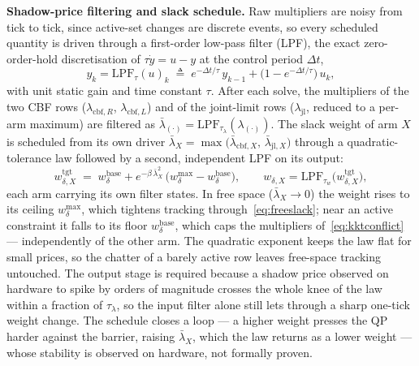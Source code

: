 \textbf{Shadow-price filtering and slack schedule.} Raw multipliers are noisy from tick to tick, since active-set changes are discrete events, so every scheduled quantity is driven through a first-order low-pass filter (LPF), the exact zero-order-hold discretisation of $\tau\dot{y} = u - y$ at the control period $\Delta t$,
\begin{equation}
y_k = \text{LPF}_{\tau}(u)_k \;\triangleq\; e^{-\Delta t/\tau}\,y_{k-1} + \bigl(1 - e^{-\Delta t/\tau}\bigr)\,u_k,
\label{eq:lpf}
\end{equation}
with unit static gain and time constant $\tau$. After each solve, the multipliers of the two CBF rows ($\lambda_{\text{cbf},R}$, $\lambda_{\text{cbf},L}$) and of the joint-limit rows ($\lambda_{\text{jl}}$, reduced to a per-arm maximum) are filtered as $\bar{\lambda}_{(\cdot)} = \text{LPF}_{\tau_{\lambda}}(\lambda_{(\cdot)})$. The slack weight of arm $X$ is scheduled from its own driver $\bar{\lambda}_X = \max\bigl(\bar{\lambda}_{\text{cbf},X},\, \bar{\lambda}_{\text{jl},X}\bigr)$ through a quadratic-tolerance law followed by a second, independent LPF on its output:
\begin{equation}
w_{\delta,X}^{\text{tgt}} \;=\; w_{\delta}^{\text{base}} + e^{-\beta\,\bar{\lambda}_X^2}\,\bigl(w_{\delta}^{\max} - w_{\delta}^{\text{base}}\bigr),
\qquad w_{\delta,X} = \text{LPF}_{\tau_{w}}\bigl(w_{\delta,X}^{\text{tgt}}\bigr),
\label{eq:slacksched}
\end{equation}
each arm carrying its own filter states. In free space ($\bar{\lambda}_X \to 0$) the weight rises to its ceiling $w_{\delta}^{\max}$, which tightens tracking through~\eqref{eq:freeslack}; near an active constraint it falls to its floor $w_{\delta}^{\text{base}}$, which caps the multipliers of~\eqref{eq:kktconflict} --- independently of the other arm. The quadratic exponent keeps the law flat for small prices, so the chatter of a barely active row leaves free-space tracking untouched. The output stage is required because a shadow price observed on hardware to spike by orders of magnitude crosses the whole knee of the law within a fraction of $\tau_{\lambda}$, so the input filter alone still lets through a sharp one-tick weight change. The schedule closes a loop --- a higher weight presses the QP harder against the barrier, raising $\bar{\lambda}_X$, which the law returns as a lower weight --- whose stability is observed on hardware, not formally proven.

